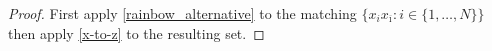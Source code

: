 \documentclass{patmorin}
\begin{document}
\begin{proof}
    First apply \cref{rainbow_alternative} to the matching $\{x_ix_{\overline\imath}: i\in\{1,\ldots,N\}\}$ then apply \cref{x-to-z} to the resulting set.
\end{proof}

%
%
%
%
%
\end{document}
